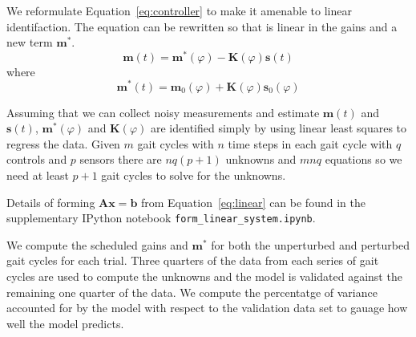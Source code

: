 \documentclass{article}
\begin{document}

We reformulate Equation~\ref{eq:controller} to make it amenable to linear
identifaction. The equation can be rewritten so that is linear in the gains and
a new term $\mathbf{m}^*$.
%
\begin{equation}
  \mathbf{m}(t) = \mathbf{m}^*(\varphi) - \mathbf{K}(\varphi) \mathbf{s}(t)
\end{equation}
%
where
%
\begin{equation}
  \mathbf{m}^*(t) = \mathbf{m}_0(\varphi) + \mathbf{K}(\varphi) \mathbf{s}_0(\varphi)
\end{equation}

Assuming that we can collect noisy measurements and estimate $\mathbf{m}(t)$
and $\mathbf{s}(t)$, $\mathbf{m}^*(\varphi)$ and $\mathbf{K}(\varphi)$ are
identified simply by using linear least squares to regress the data. Given $m$
gait cycles with $n$ time steps in each gait cycle with $q$ controls and $p$
sensors there are $nq(p + 1)$ unknowns and $mnq$ equations so we need at least
$p + 1$ gait cycles to solve for the unknowns.

Details of forming $\mathbf{Ax}=\mathbf{b}$ from Equation~\ref{eq:linear} can
be found in the supplementary IPython notebook \verb|form_linear_system.ipynb|.

We compute the scheduled gains and $\mathbf{m}^*$ for both the unperturbed and
perturbed gait cycles for each trial. Three quarters of the data from each
series of gait cycles are used to compute the unknowns and the model is
validated against the remaining one quarter of the data. We compute the
percentatge of variance accounted for by the model with respect to the
validation data set to gauage how well the model predicts.


\end{document}

